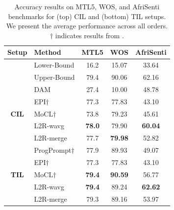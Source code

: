 \documentclass[11pt]{article}
\begin{document}
\begin{table}[]
\centering
\small
\begin{tabular}{clccc}
\hline
\textbf{Setup} & \multicolumn{1}{l}{\textbf{Method}} & \multicolumn{1}{c}{\textbf{MTL5}} & \multicolumn{1}{c}{\textbf{WOS}} & \multicolumn{1}{c}{\textbf{AfriSenti}} \\
\hline
& Lower-Bound                         & 16.2                              & 15.07                            & 33.64                                  \\
& Upper-Bound                         & 79.4                              & 90.06                            & 62.16                                  \\
\hline
& DAM                                 & 27.4                              & 10.00                            & 48.78                                  \\
& EPI$\dagger$                                 & 77.3                              & 77.83                            & 43.10                                  \\
\textbf{CIL} & MoCL$\dagger$                                & 73.8                              & 79.23                            & 45.61                                  \\
& L2R-wavg                           & \textbf{78.0}                     & 79.90                            & \textbf{60.04}                         \\
& L2R-merge                          & 77.7                              & \textbf{79.98}                   & 52.82                                 \\
\hline
& ProgPrompt$\dagger$                          & 77.9          & 89.93          & 49.07              \\
& EPI$\dagger$                                 & 77.3          & 77.83          & 43.10              \\
\textbf{TIL} & MoCL$\dagger$                                & \textbf{79.4} & \textbf{90.59} & 56.77              \\
& L2R-wavg                           & \textbf{79.4} & 89.24          & \textbf{62.62}     \\
& L2R-merge                          & 79.3          & 89.16          & 53.97             \\
\hline
\end{tabular}
\caption{Accuracy results on MTL5, WOS, and AfriSenti benchmarks for (top) CIL and (bottom) TIL setups. We present the average performance across all orders. $\dagger$ indicates results from \cite{wang2024rehearsalfree}.}
\label{tab:results}
\end{table}
\end{document}
